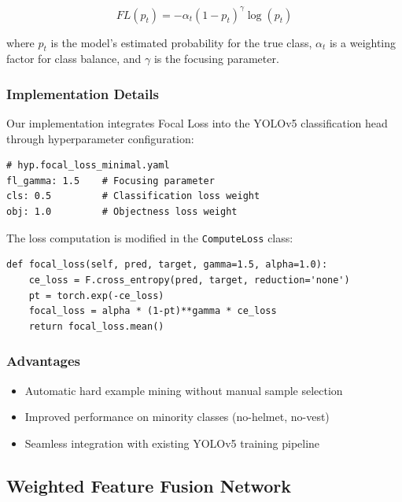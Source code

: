 \documentclass[journal]{IEEEtran}
\begin{document}
\begin{equation}
FL(p_t) = -\alpha_t(1-p_t)^\gamma \log(p_t)
\end{equation}

where $p_t$ is the model's estimated probability for the true class, $\alpha_t$ is a weighting factor for class balance, and $\gamma$ is the focusing parameter.

\subsubsection{Implementation Details}

Our implementation integrates Focal Loss into the YOLOv5 classification head through hyperparameter configuration:

\begin{lstlisting}[caption=Focal Loss Configuration]
# hyp.focal_loss_minimal.yaml
fl_gamma: 1.5    # Focusing parameter
cls: 0.5         # Classification loss weight
obj: 1.0         # Objectness loss weight
\end{lstlisting}

The loss computation is modified in the \texttt{ComputeLoss} class:

\begin{lstlisting}[caption=Focal Loss Implementation]
def focal_loss(self, pred, target, gamma=1.5, alpha=1.0):
    ce_loss = F.cross_entropy(pred, target, reduction='none')
    pt = torch.exp(-ce_loss)
    focal_loss = alpha * (1-pt)**gamma * ce_loss
    return focal_loss.mean()
\end{lstlisting}

\subsubsection{Advantages}

\begin{itemize}
\item Automatic hard example mining without manual sample selection
\item Improved performance on minority classes (no-helmet, no-vest)
\item Seamless integration with existing YOLOv5 training pipeline
\end{itemize}

\subsection{Weighted Feature Fusion Network}
\end{document}
